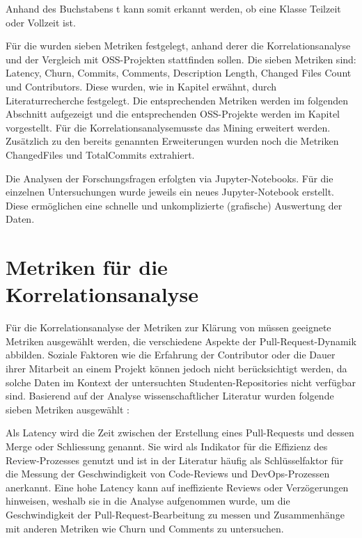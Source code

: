 Anhand des Buchstabens t kann somit erkannt werden, ob eine Klasse Teilzeit oder Vollzeit ist.

Für die  wurden sieben Metriken festgelegt, anhand derer die Korrelationsanalyse und der Vergleich mit OSS-Projekten stattfinden sollen. Die sieben Metriken sind: Latency, Churn, Commits, Comments, Description Length, Changed Files Count und Contributors. Diese wurden, wie in Kapitel  erwähnt, durch Literaturrecherche festgelegt. Die entsprechenden Metriken werden im folgenden Abschnitt  aufgezeigt und die entsprechenden OSS-Projekte werden im Kapitel  vorgestellt. Für die Korrelationsanalyse\linebreak musste das Mining erweitert werden. Zusätzlich zu den bereits genannten Erweiterungen wurden noch die Metriken ChangedFiles und TotalCommits  extrahiert.

Die Analysen der Forschungsfragen erfolgten via Jupyter-Notebooks. Für die einzelnen Untersuchungen wurde jeweils ein neues Jupyter-Notebook erstellt. Diese ermöglichen eine schnelle und unkomplizierte (grafische) Auswertung der Daten.~\parencite{noauthor_repo-detectivesba-metric-analysis-scripts_nodate}


\section{Metriken für die Korrelations\-analyse}
\label{sec:MetrikenKorrelation}
Für die Korrelationsanalyse der Metriken zur Klärung von  müssen geeignete Metriken ausgewählt werden, die verschiedene Aspekte der Pull-Request-Dynamik abbilden. Soziale Faktoren wie die Erfahrung der Contributor oder die Dauer ihrer Mitarbeit an einem Projekt können jedoch nicht berücksichtigt werden, da solche Daten im Kontext der untersuchten Studenten-Repositories nicht verfügbar sind. Basierend auf der Analyse wissenschaftlicher Literatur wurden folgende sieben Metriken ausgewählt \parencite{yu_wait_2015}\parencite{gousios_exploratory_2014}\parencite{zhang_pull_2022}\parencite{tsay_influence_2014}:

Als Latency wird die Zeit zwischen der Erstellung eines Pull-Requests und dessen Merge oder Schliessung genannt. Sie wird als Indikator für die Effizienz des Review-Prozesses genutzt und ist in der Literatur häufig als Schlüsselfaktor für die Messung der Geschwindigkeit von Code-Reviews und DevOps-Prozessen anerkannt. Eine hohe Latency kann auf ineffiziente Reviews oder Verzögerungen hinweisen, weshalb sie in die Analyse aufgenommen wurde, um die Geschwindigkeit der Pull-Request-Bearbeitung zu messen und Zusammenhänge mit anderen Metriken wie Churn und Comments zu untersuchen. \parencite{yu_wait_2015}

